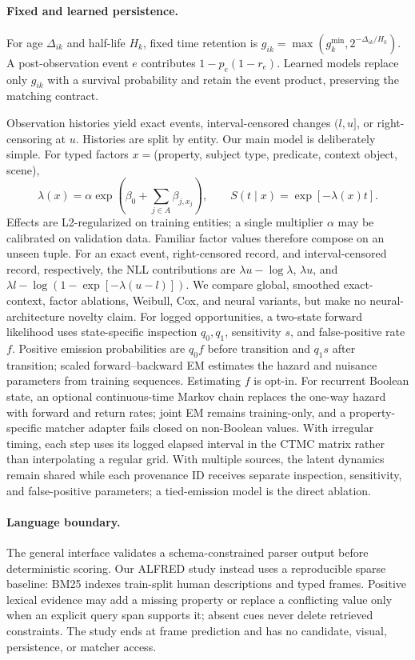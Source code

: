 \documentclass{article}
\begin{document}
\paragraph{Fixed and learned persistence.}
For age $\Delta_{ik}$ and half-life $H_k$, fixed time retention is $g_{ik}=\max(g_k^{\min},2^{-\Delta_{ik}/H_k})$. A post-observation event $e$ contributes $1-p_e(1-r_e)$. Learned models replace only $g_{ik}$ with a survival probability and retain the event product, preserving the matching contract.

Observation histories yield exact events, interval-censored changes $(l,u]$, or right-censoring at $u$. Histories are split by entity. Our main model is deliberately simple. For typed factors $x=$(property, subject type, predicate, context object, scene),
\begin{equation}
\lambda(x)=\alpha\exp\!\left(\beta_0+\sum_{j\in A}\beta_{j,x_j}\right),
\qquad S(t\mid x)=\exp[-\lambda(x)t].
\label{eq:survival}
\end{equation}
Effects are L2-regularized on training entities; a single multiplier $\alpha$ may be calibrated on validation data. Familiar factor values therefore compose on an unseen tuple. For an exact event, right-censored record, and interval-censored record, respectively, the NLL contributions are $\lambda u-\log\lambda$, $\lambda u$, and
$\lambda l-\log(1-\exp[-\lambda(u-l)])$. We compare global, smoothed exact-context, factor ablations, Weibull, Cox, and neural variants, but make no neural-architecture novelty claim.
For logged opportunities, a two-state forward likelihood uses state-specific inspection $q_0,q_1$, sensitivity $s$, and false-positive rate $f$. Positive emission probabilities are $q_0f$ before transition and $q_1s$ after transition; scaled forward--backward EM estimates the hazard and nuisance parameters from training sequences. Estimating $f$ is opt-in. For recurrent Boolean state, an optional continuous-time Markov chain replaces the one-way hazard with forward and return rates; joint EM remains training-only, and a property-specific matcher adapter fails closed on non-Boolean values. With irregular timing, each step uses its logged elapsed interval in the CTMC matrix rather than interpolating a regular grid. With multiple sources, the latent dynamics remain shared while each provenance ID receives separate inspection, sensitivity, and false-positive parameters; a tied-emission model is the direct ablation.

\paragraph{Language boundary.}
The general interface validates a schema-constrained parser output before deterministic scoring. Our ALFRED study instead uses a reproducible sparse baseline: BM25 indexes train-split human descriptions and typed frames. Positive lexical evidence may add a missing property or replace a conflicting value only when an explicit query span supports it; absent cues never delete retrieved constraints. The study ends at frame prediction and has no candidate, visual, persistence, or matcher access.
\end{document}
